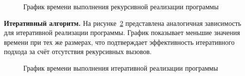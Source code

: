 \begin{figure}[H]
	\caption{График времени выполнения рекурсивной реализации программы}
	\label{pic_recursive}
\end{figure}

\textbf{Итеративный алгоритм.}  
На рисунке~\ref{pic_iterative} представлена аналогичная зависимость для итеративной реализации программы.  
График показывает меньшие значения времени при тех же размерах, что подтверждает эффективность итеративного подхода за счёт отсутствия рекурсивных вызовов.

\begin{figure}[H]
	\caption{График времени выполнения итеративной реализации программы}
	\label{pic_iterative}
\end{figure}


